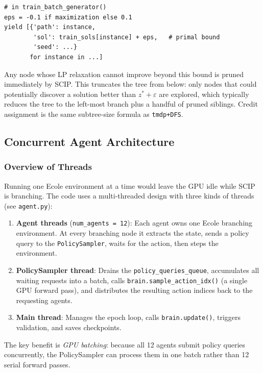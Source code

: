 \begin{lstlisting}
# in train_batch_generator()
eps = -0.1 if maximization else 0.1
yield [{'path': instance,
        'sol': train_sols[instance] + eps,   # primal bound
        'seed': ...}
       for instance in ...]
\end{lstlisting}

Any node whose LP relaxation cannot improve beyond this bound is pruned immediately by SCIP. This truncates the tree from below: only nodes that could potentially discover a solution better than $z^* + \varepsilon$ are explored, which typically reduces the tree to the left-most branch plus a handful of pruned siblings. Credit assignment is the same subtree-size formula as \texttt{tmdp+DFS}.

\subsection{Concurrent Agent Architecture}

\subsubsection{Overview of Threads}

Running one Ecole environment at a time would leave the GPU idle while SCIP is branching. The code uses a multi-threaded design with three kinds of threads (see \texttt{agent.py}):

\begin{enumerate}
    \item \textbf{Agent threads} (\texttt{num\_agents = 12}): Each agent owns one Ecole branching environment. At every branching node it extracts the state, sends a policy query to the \texttt{PolicySampler}, waits for the action, then steps the environment.
    \item \textbf{PolicySampler thread}: Drains the \texttt{policy\_queries\_queue}, accumulates all waiting requests into a batch, calls \texttt{brain.sample\_action\_idx()} (a single GPU forward pass), and distributes the resulting action indices back to the requesting agents.
    \item \textbf{Main thread}: Manages the epoch loop, calls \texttt{brain.update()}, triggers validation, and saves checkpoints.
\end{enumerate}

The key benefit is \emph{GPU batching}: because all 12 agents submit policy queries concurrently, the PolicySampler can process them in one batch rather than 12 serial forward passes.


